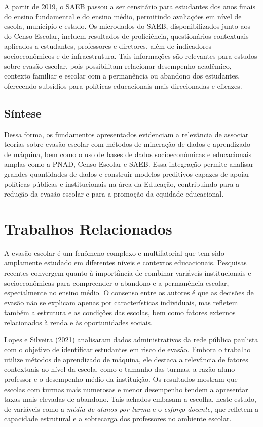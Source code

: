\documentclass[english, spanish, brazilian]{RBIEarticle} %
\begin{document}
A partir de 2019, o SAEB passou a ser censitário para estudantes dos anos finais do ensino fundamental e do ensino médio, permitindo avaliações em nível de escola, município e estado. Os microdados do SAEB, disponibilizados junto aos do Censo Escolar, incluem resultados de proficiência, questionários contextuais aplicados a estudantes, professores e diretores, além de indicadores socioeconômicos e de infraestrutura. Tais informações são relevantes para estudos sobre evasão escolar, pois possibilitam relacionar desempenho acadêmico, contexto familiar e escolar com a permanência ou abandono dos estudantes, oferecendo subsídios para políticas educacionais mais direcionadas e eficazes.

\subsection{Síntese}
Dessa forma, os fundamentos apresentados evidenciam a relevância de associar teorias sobre evasão escolar com métodos de mineração de dados e aprendizado de máquina, bem como o uso de bases de dados socioeconômicas e educacionais amplas como a PNAD, Censo Escolar e SAEB. Essa integração permite analisar grandes quantidades de dados e construir modelos preditivos capazes de apoiar políticas públicas e institucionais na área da Educação, contribuindo para a redução da evasão escolar e para a promoção da equidade educacional.

\section{Trabalhos Relacionados}
A evasão escolar é um fenômeno complexo e multifatorial que tem sido amplamente estudado em diferentes níveis e contextos educacionais. Pesquisas recentes convergem quanto à importância de combinar variáveis institucionais e socioeconômicas para compreender o abandono e a permanência escolar, especialmente no ensino médio. O consenso entre os autores é que as decisões de evasão não se explicam apenas por características individuais, mas refletem também a estrutura e as condições das escolas, bem como fatores externos relacionados à renda e às oportunidades sociais.

Lopes e Silveira (2021) analisaram dados administrativos da rede pública paulista com o objetivo de identificar estudantes em risco de evasão. Embora o trabalho utilize métodos de aprendizado de máquina, ele destaca a relevância de fatores contextuais ao nível da escola, como o tamanho das turmas, a razão aluno-professor e o desempenho médio da instituição. Os resultados mostram que escolas com turmas mais numerosas e menor desempenho tendem a apresentar taxas mais elevadas de abandono. Tais achados embasam a escolha, neste estudo, de variáveis como a \textit{média de alunos por turma} e o \textit{esforço docente}, que refletem a capacidade estrutural e a sobrecarga dos professores no ambiente escolar.
\end{document}
